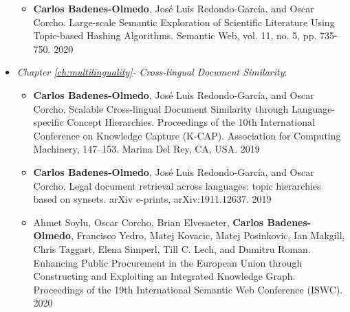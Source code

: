 \begin{itemize}
\begin{itemize}
\item \textbf{Carlos Badenes-Olmedo}, José Luis Redondo-García, and Oscar Corcho. Large-scale Semantic Exploration of Scientific Literature Using Topic-based Hashing Algorithms. Semantic Web, vol. 11, no. 5, pp. 735-750. 2020
\end{itemize}
\item \textit{Chapter \ref{ch:multilinguality}- Cross-lingual Document Similarity}:
\begin{itemize}
\item \textbf{Carlos Badenes-Olmedo}, José Luis Redondo-García, and Oscar Corcho. Scalable Cross-lingual Document Similarity through Language-specific Concept Hierarchies. Proceedings of the 10th International Conference on Knowledge Capture (K-CAP). Association for Computing Machinery, 147–153. Marina Del Rey, CA, USA. 2019
\item \textbf{Carlos Badenes-Olmedo}, José Luis Redondo-García, and Oscar Corcho. Legal document retrieval across languages: topic hierarchies based on synsets. arXiv e-prints, arXiv:1911.12637. 2019
\item Ahmet Soylu, Oscar Corcho, Brian Elvesaeter, \textbf{Carlos Badenes-Olmedo}, Francisco Yedro, Matej Kovacic, Matej Posinkovic, Ian Makgill, Chris Taggart, Elena Simperl, Till C. Lech, and Dumitru Roman. Enhancing Public Procurement in the European Union through Constructing and Exploiting an Integrated Knowledge Graph. Proceedings of the 19th International Semantic Web Conference (ISWC). 2020
\end{itemize}
\end{itemize}


